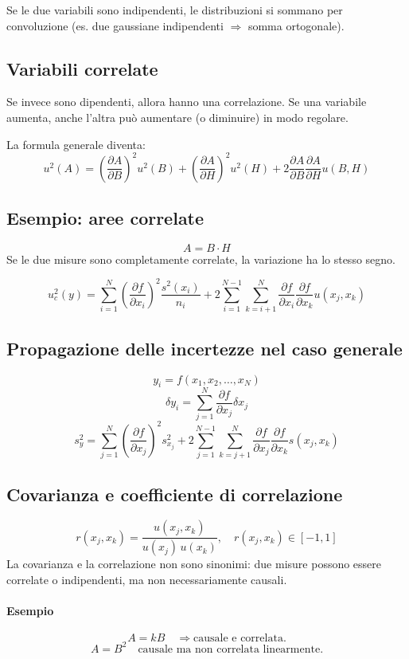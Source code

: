 Se le due variabili sono indipendenti, le distribuzioni si sommano per convoluzione (es. due gaussiane indipendenti $\Rightarrow$ somma ortogonale).

\subsection*{Variabili correlate}
Se invece sono dipendenti, allora hanno una correlazione. Se una variabile aumenta, anche l’altra può aumentare (o diminuire) in modo regolare.

La formula generale diventa:
\[
u^2(A) = 
\left( \frac{\partial A}{\partial B} \right)^2 u^2(B)
+ \left( \frac{\partial A}{\partial H} \right)^2 u^2(H)
+ 2 \frac{\partial A}{\partial B} \frac{\partial A}{\partial H} u(B,H)
\]

\subsection{Esempio: aree correlate}
\[
A = B \cdot H
\]
Se le due misure sono completamente correlate, la variazione ha lo stesso segno.

\[
u_c^2(y) = \sum_{i=1}^N \left( \frac{\partial f}{\partial x_i} \right)^2 \frac{s^2(x_i)}{n_i} + 2 \sum_{i=1}^{N-1}\sum_{k=i+1}^{N} \frac{\partial f}{\partial x_i}\frac{\partial f}{\partial x_k} u(x_j,x_k)
\]

\subsection{Propagazione delle incertezze nel caso generale}
\[
y_i = f(x_1, x_2, \ldots, x_N)
\]
\[
\delta y_i = \sum_{j=1}^{N} \frac{\partial f}{\partial x_j} \delta x_j
\]
\[
s_y^2 = \sum_{j=1}^{N} \left( \frac{\partial f}{\partial x_j} \right)^2 s_{x_j}^2
 + 2 \sum_{j=1}^{N-1}\sum_{k=j+1}^{N} \frac{\partial f}{\partial x_j}\frac{\partial f}{\partial x_k} s(x_j,x_k)
\]

\subsection{Covarianza e coefficiente di correlazione}
\[
r(x_j,x_k) = \frac{u(x_j,x_k)}{u(x_j)\,u(x_k)}, \quad r(x_j,x_k) \in [-1,1]
\]
La covarianza e la correlazione non sono sinonimi: due misure possono essere correlate o indipendenti, ma non necessariamente causali.

\paragraph{Esempio}
\[
A = kB \quad \Rightarrow \text{causale e correlata.}
\]
\[
A = B^2 \quad \text{causale ma non correlata linearmente.}
\]

